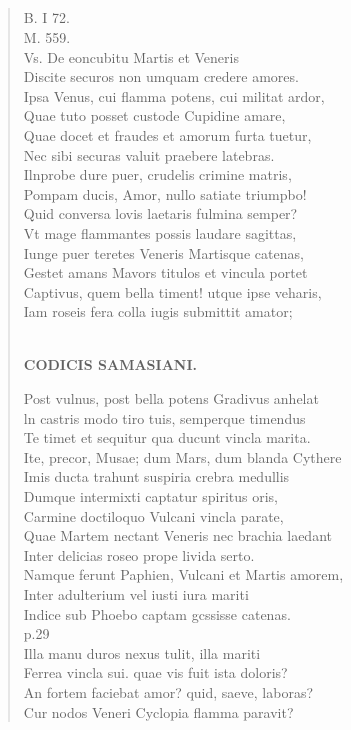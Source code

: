 \documentclass[11pt, a4paper]{report}
\begin{document}
            \subsection*{}
      \begin{verse}
      B. I 72. \\ M. 559. \\ Vs. De eoncubitu Martis et Veneris \\ Discite securos non umquam credere amores. \\ Ipsa Venus, cui flamma potens, cui militat ardor, \\ Quae tuto posset custode Cupidine amare, \\ Quae docet et fraudes et amorum furta tuetur, \\ Nec sibi securas valuit praebere latebras. \\ Ilnprobe dure puer, crudelis crimine matris, \\ Pompam ducis, Amor, nullo satiate triumpbo! \\ Quid conversa lovis laetaris fulmina semper? \\ Vt mage flammantes possis laudare sagittas, \\ Iunge puer teretes Veneris Martisque catenas, \\ Gestet amans Mavors titulos et vincula portet \\ Captivus, quem bella timent! utque ipse veharis, \\ Iam roseis fera colla iugis submittit amator; \\ 
        ﻿\pagebreak 
    \begin{center} \textbf{CODICIS SAMASIANI.} \end{center} \marginpar{[203]} Post vulnus, post bella potens Gradivus anhelat \\ ln castris modo tiro tuis, semperque timendus \\ Te timet et sequitur qua ducunt vincla marita. \\ Ite, precor, Musae; dum Mars, dum blanda Cythere \\ Imis ducta trahunt suspiria crebra medullis \\ Dumque intermixti captatur spiritus oris, \\ Carmine doctiloquo Vulcani vincla parate, \\ Quae Martem nectant Veneris nec brachia laedant \\ Inter delicias roseo prope livida serto. \\ Namque ferunt Paphien, Vulcani et Martis amorem, \\ Inter adulterium vel iusti iura mariti \\ Indice sub Phoebo captam gcssisse catenas. \\ p.29 \\ Illa manu duros nexus tulit, illa mariti \\ Ferrea vincla sui. quae vis fuit ista doloris? \\ An fortem faciebat amor? quid, saeve, laboras? \\ Cur nodos Veneri Cyclopia flamma paravit? \\ 
      \end{verse}
  
\end{document}
